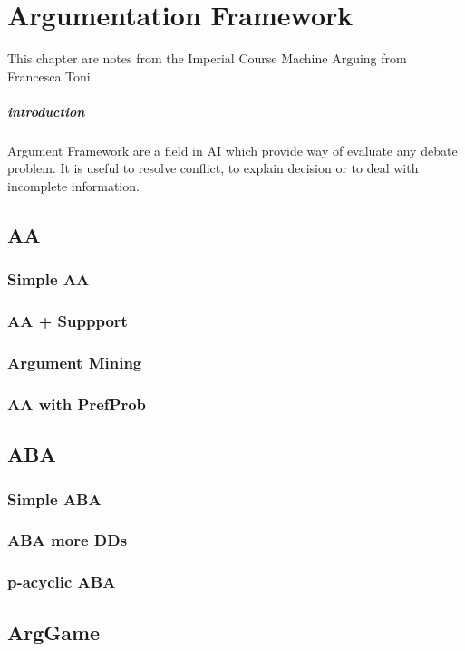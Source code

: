 \chapter{Argumentation Framework} %
\label{cha:argumentation_framework}

This chapter are notes from the Imperial Course Machine Arguing from Francesca Toni. 

\paragraph{introduction} %
\label{par:introduction}

Argument Framework are a field in AI which provide way of evaluate any debate problem. It is useful to resolve conflict, to explain decision or to deal with incomplete information. 
\section{AA}

\subsection{Simple AA}
\subsection{AA + Suppport}
\subsection{Argument Mining}
\subsection{AA with PrefProb}
\section{ABA}
\subsection{Simple ABA}

\subsection{ABA more DDs}
\subsection{p-acyclic ABA}
\section{ArgGame}
